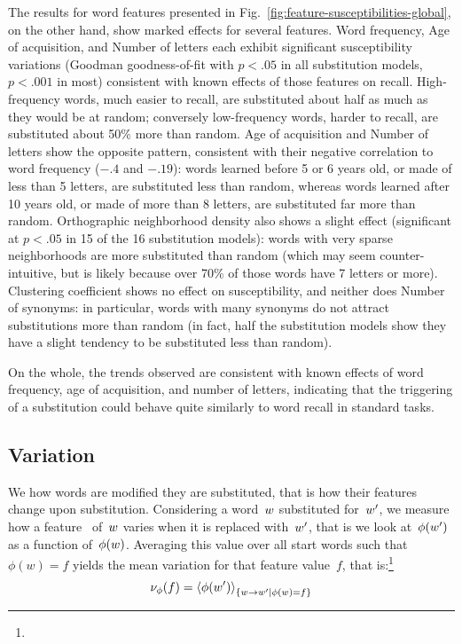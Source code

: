 \begin{new}

The results for word features presented in Fig.~\ref{fig:feature-susceptibilities-global}, on the other hand, show marked effects for several features.
Word frequency, Age of acquisition, and Number of letters each exhibit significant susceptibility variations (Goodman goodness-of-fit with $p < .05$ in all substitution models, $p < .001$ in most) consistent with known effects of those features on recall.
High-frequency words, much easier to recall, are substituted about half as much as they would be at random; conversely low-frequency words, harder to recall, are substituted about 50\% more than random.
Age of acquisition and Number of letters show the opposite pattern, consistent with their negative correlation to word frequency ($-.4$ and $-.19$):
words learned before 5 or 6 years old, or made of less than 5 letters, are substituted less than random, whereas words learned after 10 years old, or made of more than 8 letters, are substituted far more than random.
Orthographic neighborhood density also shows a slight effect (significant at $p < .05$ in 15 of the 16 substitution models):
words with very sparse neighborhoods are more substituted than random (which may seem counter-intuitive, but is likely because over 70\% of those words have 7 letters or more).
Clustering coefficient shows no effect on susceptibility, and neither does Number of synonyms:
in particular, words with many synonyms do not attract substitutions more than random (in fact, half the substitution models show they have a slight tendency to be substituted less than random).

On the whole, the trends observed are consistent with known effects of word frequency, age of acquisition, and number of letters, indicating that the triggering of a substitution could behave quite similarly to word recall in standard tasks.

\end{new}

\subsection{Variation}



We  how words are modified  they are substituted, that is how their features change upon substitution.
Considering a word~$w$ substituted for~$w'$, we measure how a feature~\newtext{$\phi$} of~$w$ varies when it is replaced with~$w'$, that is we look at~$\phi(w')$ as a function of~$\phi(w)$.
Averaging this value over all start words such that $\phi(w) = f$ yields the mean variation for that feature value~$f$, that is:\footnote{
}
$$\nu_{\phi}(f) = \left<\phi(w')\right>_{\left\lbrace w\rightarrow w' | \phi(w) = f \right\rbrace}$$

